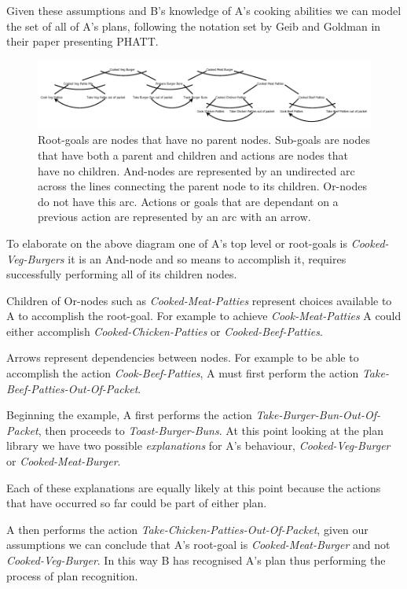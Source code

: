 \documentclass[parskip]{cs4rep}
\begin{document}
Given these assumptions and B's knowledge of A's cooking abilities we can model the set of all of A's plans, following the notation set by Geib and Goldman in their paper presenting PHATT.

\begin{figure}[h]
\centering
\includegraphics{images/example-plan-recognition}
\caption{Root-goals are nodes that have no parent nodes. Sub-goals are nodes that have both a parent and children and actions are nodes that have no children. And-nodes are represented by an undirected arc across the lines connecting the parent node to its children. Or-nodes do not have this arc. Actions or goals that are dependant on a previous action are represented by an arc with an arrow.}
\label{fig:example-plan-library}
\end{figure} 

To elaborate on the above diagram one of A's top level or root-goals is \textit{Cooked-Veg-Burgers} it is an And-node and so means to accomplish it, requires successfully performing all of its children nodes. 

Children of Or-nodes such as \textit{Cooked-Meat-Patties} represent choices available to A to accomplish the root-goal. For example to achieve \textit{Cook-Meat-Patties} A could either accomplish \textit{Cooked-Chicken-Patties} or \textit{Cooked-Beef-Patties}.

Arrows represent dependencies between nodes. For example to be able to accomplish the action \textit{Cook-Beef-Patties}, A must first perform the action \textit{Take-Beef-Patties-Out-Of-Packet}.

Beginning the example, A first performs the action \textit{Take-Burger-Bun-Out-Of-Packet}, then proceeds to \textit{Toast-Burger-Buns}. At this point looking at the plan library we have two possible \textit{explanations} for A's behaviour, \textit{Cooked-Veg-Burger} or \textit{Cooked-Meat-Burger}.

Each of these explanations are equally likely at this point because the actions that have occurred so far could be part of either plan.

A then performs the action \textit{Take-Chicken-Patties-Out-Of-Packet}, given our assumptions we can conclude that A's root-goal is \textit{Cooked-Meat-Burger} and not \textit{Cooked-Veg-Burger}. In this way B has recognised A's plan thus performing the process of plan recognition.
\end{document}
